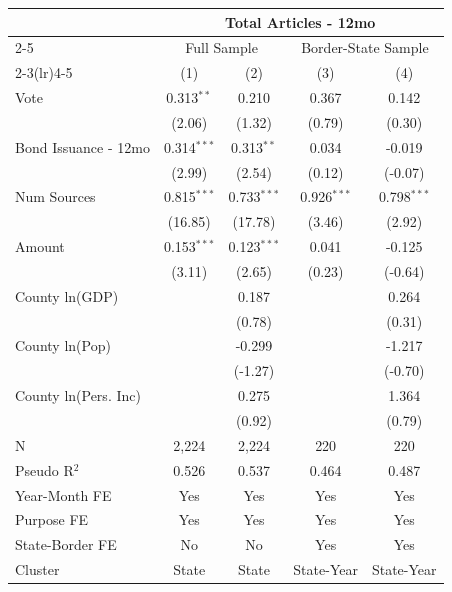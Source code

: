 \begingroup
\centering
\begin{tabular*}{\textwidth}{@{\extracolsep{\fill}}lcccc}
   \toprule
    & \multicolumn{4}{c}{Total Articles - 12mo}\\
   \cmidrule(lr){2-5}
    & \multicolumn{2}{c}{Full Sample} & \multicolumn{2}{c}{Border-State Sample}\\
   \cmidrule(lr){2-3}\cmidrule(lr){4-5}
                        & (1)           & (2)           & (3)           & (4)\\  
   \midrule 
   Vote                 & 0.313$^{**}$  & 0.210         & 0.367         & 0.142\\   
                        & (2.06)       & (1.32)       & (0.79)       & (0.30)\\   
   Bond Issuance - 12mo & 0.314$^{***}$ & 0.313$^{**}$  & 0.034         & -0.019\\   
                        & (2.99)       & (2.54)       & (0.12)       & (-0.07)\\   
   Num Sources          & 0.815$^{***}$ & 0.733$^{***}$ & 0.926$^{***}$ & 0.798$^{***}$\\   
                        & (16.85)      & (17.78)      & (3.46)       & (2.92)\\   
   Amount               & 0.153$^{***}$ & 0.123$^{***}$ & 0.041         & -0.125\\   
                        & (3.11)       & (2.65)       & (0.23)       & (-0.64)\\   
   County ln(GDP)       &               & 0.187         &               & 0.264\\   
                        &               & (0.78)       &               & (0.31)\\   
   County ln(Pop)       &               & -0.299        &               & -1.217\\   
                        &               & (-1.27)      &               & (-0.70)\\   
   County ln(Pers. Inc) &               & 0.275         &               & 1.364\\   
                        &               & (0.92)       &               & (0.79)\\   
   \hline
   N         & 2,224         & 2,224         & 220           & 220\\  
   Pseudo R$^2$         & 0.526         & 0.537         & 0.464         & 0.487\\  
   Year-Month FE        & Yes           & Yes           & Yes           & Yes\\  
   Purpose FE           & Yes           & Yes           & Yes           & Yes\\  
   State-Border FE      & No            & No            & Yes           & Yes\\  
   Cluster              & State & State & State-Year & State-Year\\  
   \bottomrule
\end{tabular*}
\par\endgroup
